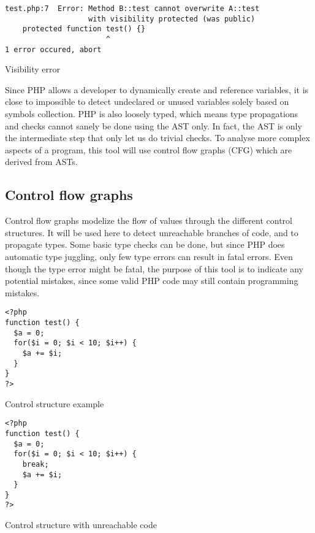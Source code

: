 \documentclass[a4paper]{article}
\begin{document}
\begin{listing}
  \begin{verbatim}
test.php:7  Error: Method B::test cannot overwrite A::test 
                   with visibility protected (was public)
    protected function test() {}
                       ^
1 error occured, abort
  \end{verbatim}
  \caption{Visibility error}
\end{listing}

Since PHP allows a developer to dynamically create and reference variables, it
is close to impossible to detect undeclared or unused variables solely based on
symbols collection. PHP is also loosely typed, which means type propagations
and checks cannot sanely be done using the AST only. In fact, the AST is only the
intermediate step that only let us do trivial checks. To analyse more complex
aspects of a program, this tool will use control flow graphs (CFG) which are
derived from ASTs.

\subsection{Control flow graphs}
Control flow graphs modelize the flow of values through the different control
structures. It will be used here to detect unreachable branches of code, and to
propagate types. Some basic type checks can be done, but since PHP does
automatic type juggling, only few type errors can result in fatal errors.
Even though the type error might be fatal, the purpose of this tool is to indicate
any potential mistakes, since some valid PHP code may still contain programming
mistakes.
\begin{listing}
  \begin{verbatim}
<?php
function test() {
  $a = 0;
  for($i = 0; $i < 10; $i++) {
    $a += $i;
  }
}
?>
  \end{verbatim}
  \caption{Control structure example}
  \label{cfg1}
\end{listing}


\begin{listing}
  \begin{verbatim}
<?php
function test() {
  $a = 0;
  for($i = 0; $i < 10; $i++) {
    break;
    $a += $i;
  }
}
?>
  \end{verbatim}
  \caption{Control structure with unreachable code}
  \label{cfg2}
\end{listing}
\end{document}
